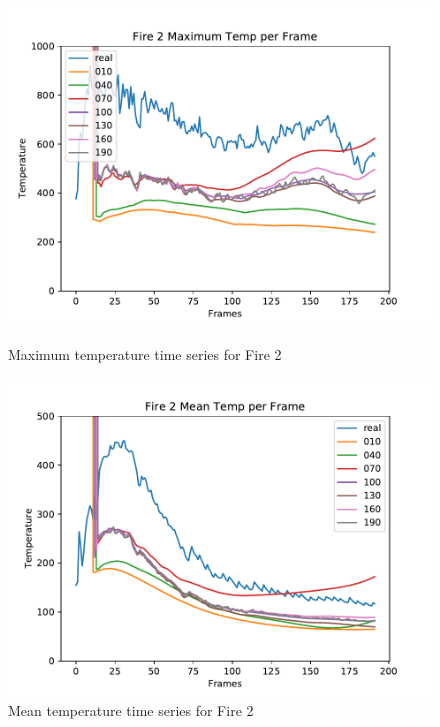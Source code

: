 \documentclass{article}
\begin{document}
\begin{figure}[ht] 
\centering
  \label{ fig7} 
  \begin{minipage}[b]{0.5\linewidth}
    \centering
    \includegraphics[width=1.1\linewidth]{../plots/f2_maxtemp.pdf} 
    \caption{Maximum temperature time series for Fire 2} 
    \vspace{4ex}
  \end{minipage}%
  \begin{minipage}[b]{0.5\linewidth}
    \centering
    \includegraphics[width=1.1\linewidth]{../plots/f2_meantemp.pdf} 
    \caption{Mean temperature time series for Fire 2} 
    \vspace{4ex}
  \end{minipage} 

\end{figure}
\end{document}
